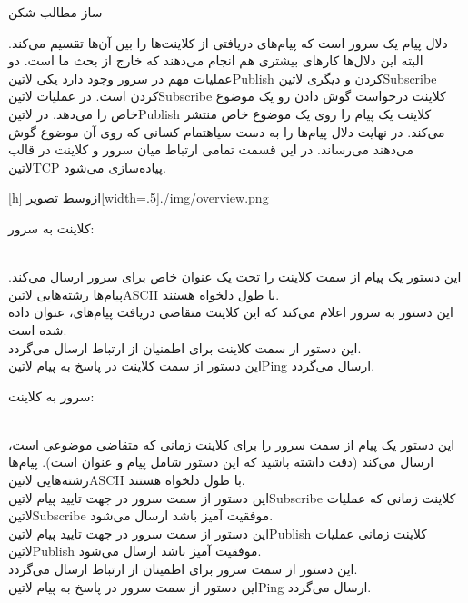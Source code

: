 \documentclass[]{../assignment}
\begin{document}
  ‌ساز
  ‌مطالب
  ‌شکن


  دلال پیام یک سرور است که پیام‌های دریافتی از کلاینت‌ها را بین آن‌ها تقسیم می‌کند. البته این دلال‌ها کارهای بیشتری هم انجام می‌دهند که خارج از بحث ما است.
  دو عملیات مهم در سرور وجود دارد یکی ‌لاتین{Publish} کردن و دیگری ‌لاتین{Subscribe} کردن است. در عملیات ‌لاتین{Subscribe} کلاینت درخواست گوش دادن رو یک موضوع خاص را می‌دهد.
  در ‌لاتین{Publish} کلاینت یک پیام را روی یک موضوع خاص منتشر می‌کند. در نهایت دلال پیام‌ها را به دست ‌سیاه{تمام} کسانی که روی آن موضوع گوش می‌دهند می‌رساند.
  در این قسمت تمامی ارتباط میان سرور و کلاینت در قالب ‌لاتین{TCP} پیاده‌سازی می‌شود.

  [h]
  ‌ازوسط
  ‌تصویر[width=.5\textwidth]{./img/overview.png}


  کلاینت به سرور:

    \\ این دستور یک پیام از سمت کلاینت را تحت یک عنوان خاص برای سرور ارسال می‌کند. پیام‌ها رشته‌هایی ‌لاتین{ASCII} با طول دلخواه هستند.
    \\ این دستور به سرور اعلام می‌کند که این کلاینت متقاضی دریافت پیام‌های، عنوان داده شده است.
    \\ این دستور از سمت کلاینت برای اطمنیان از ارتباط ارسال می‌گردد.
    \\ این دستور از سمت کلاینت در پاسخ به پیام ‌لاتین{Ping} ارسال می‌گردد.

  سرور به کلاینت:

    \\ این دستور یک پیام از سمت سرور را برای کلاینت زمانی که متقاضی موضوعی است، ارسال می‌کند (دقت داشته باشید که این دستور شامل پیام و عنوان است). پیام‌ها رشته‌هایی ‌لاتین{ASCII} با طول دلخواه هستند.
    \\ این دستور از سمت سرور در جهت تایید پیام ‌لاتین{Subscribe} کلاینت زمانی که عملیات ‌لاتین{Subscribe} موفقیت آمیز باشد ارسال می‌شود.
    \\ این دستور از سمت سرور در جهت تایید پیام ‌لاتین{Publish} کلاینت زمانی عملیات ‌لاتین{Publish} موفقیت آمیز باشد ارسال می‌شود.
    \\ این دستور از سمت سرور برای اطمینان از ارتباط ارسال می‌گردد.
    \\ این دستور از سمت سرور در پاسخ به پیام ‌لاتین{Ping} ارسال می‌گردد.
\end{document}

